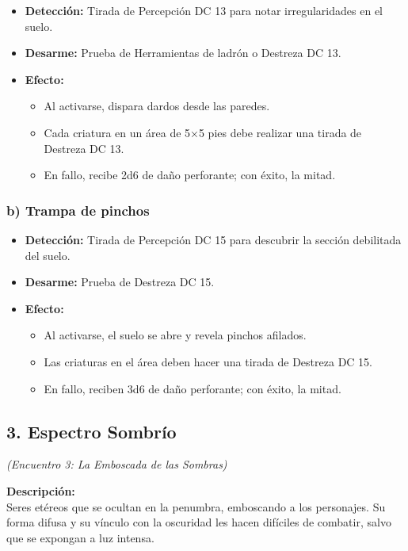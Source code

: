 \documentclass[
  twocolumn]{article}
\providecommand{\tightlist}{%
  \setlength{\itemsep}{0pt}\setlength{\parskip}{0pt}}
\begin{document}
\begin{itemize}
\tightlist
\item
  \textbf{Detección:} Tirada de Percepción DC 13 para notar
  irregularidades en el suelo.
\item
  \textbf{Desarme:} Prueba de Herramientas de ladrón o Destreza DC 13.
\item
  \textbf{Efecto:}

  \begin{itemize}
  \tightlist
  \item
    Al activarse, dispara dardos desde las paredes.
  \item
    Cada criatura en un área de 5×5 pies debe realizar una tirada de
    Destreza DC 13.
  \item
    En fallo, recibe 2d6 de daño perforante; con éxito, la mitad.
  \end{itemize}
\end{itemize}

\subsubsection{b) Trampa de pinchos}\label{b-trampa-de-pinchos}

\begin{itemize}
\tightlist
\item
  \textbf{Detección:} Tirada de Percepción DC 15 para descubrir la
  sección debilitada del suelo.
\item
  \textbf{Desarme:} Prueba de Destreza DC 15.
\item
  \textbf{Efecto:}

  \begin{itemize}
  \tightlist
  \item
    Al activarse, el suelo se abre y revela pinchos afilados.
  \item
    Las criaturas en el área deben hacer una tirada de Destreza DC 15.
  \item
    En fallo, reciben 3d6 de daño perforante; con éxito, la mitad.
  \end{itemize}
\end{itemize}

\subsection{3. Espectro Sombrío}\label{espectro-sombruxedo}

\emph{(Encuentro 3: La Emboscada de las Sombras)}

\textbf{Descripción:}\\
Seres etéreos que se ocultan en la penumbra, emboscando a los
personajes. Su forma difusa y su vínculo con la oscuridad les hacen
difíciles de combatir, salvo que se expongan a luz intensa.
\end{document}

